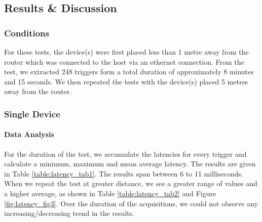 \subsection{Results \& Discussion}

\subsubsection{Conditions}
For these tests, the device(s) were first placed less than 1 metre away from the router which was connected to the host via an ethernet connection. From the test, we extracted 248 triggers form a total duration of approximately 8 minutes and 15 seconds. We then repeated the tests with the device(s) placed 5 metres away from the router.

\subsubsection{Single Device}

\paragraph{Data Analysis}
For the duration of the test, we accumulate the latencies for every trigger and calculate a minimum, maximum and mean average latency. The results are given in Table \ref{table:latency_tab1}. The results span between 6 to 11 milliseconds. When we repeat the test at greater distance, we see a greater range of values and a higher average, as shown in Table \ref{table:latency_tab2} and Figure \ref{fig:latency_fig3}. Over the duration of the acquisitions, we could not observe any increasing/decreasing trend in the results.


